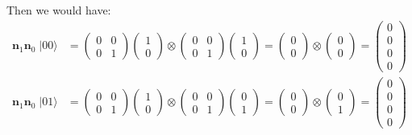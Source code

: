 \documentclass{article}
\begin{document}
Then we would have:
\begin{align*}
\bm{n}_1\bm{n}_0 \; |00\rangle
  &= \begin{pmatrix}0 & 0\\0 & 1\end{pmatrix}
     \begin{pmatrix}1\\0\end{pmatrix}
     \otimes
     \begin{pmatrix}0 & 0\\0 & 1\end{pmatrix}
     \begin{pmatrix}1\\0\end{pmatrix}
     = \begin{pmatrix}0\\0\end{pmatrix}
     \otimes
     \begin{pmatrix}0\\0\end{pmatrix}
     = \begin{pmatrix}0\\0\\0\\0\end{pmatrix}\\
\bm{n}_1\bm{n}_0 \; |01\rangle
  &= \begin{pmatrix}0 & 0\\0 & 1\end{pmatrix}
     \begin{pmatrix}1\\0\end{pmatrix}
     \otimes
     \begin{pmatrix}0 & 0\\0 & 1\end{pmatrix}
     \begin{pmatrix}0\\1\end{pmatrix}
     = \begin{pmatrix}0\\0\end{pmatrix}
     \otimes
     \begin{pmatrix}0\\1\end{pmatrix}
     = \begin{pmatrix}0\\0\\0\\0\end{pmatrix}\\

\end{align*}
\end{document}
